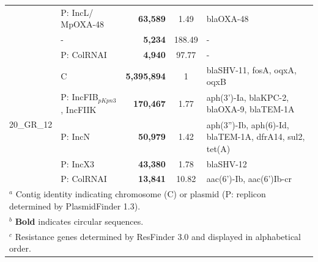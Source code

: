 \begin{landscape}
\begin{table}[!ht]
\begin{tabular}{|l|l|r|c|p{12cm}|}
                            & P: IncL/ MpOXA-48           & \textbf{63,589}       & 1.49     & blaOXA-48                                                                                                                                  \\ \cline{2-5} 
                            & -                           & \textbf{5,234}        & 188.49   & -                                                                                                                                          \\ \cline{2-5} 
                            & P: ColRNAI                  & \textbf{4,940 }       & 97.77    & -                                                                                                                                          \\ \hline \hline
\multirow{5}{*}{20\_GR\_12} & C                           & \textbf{5,395,894}     & 1        & blaSHV-11, fosA, oqxA, oqxB                                                                                                                \\ \cline{2-5} 
                            & P: IncFIB$_{pKpn3}$, IncFIIK     & \textbf{170,467}      & 1.77     & aph(3')-Ia, blaKPC-2, blaOXA-9, blaTEM-1A                                                                                                  \\ \cline{2-5} 
                            & P: IncN                     & \textbf{50,979}       & 1.42     & aph(3'')-Ib, aph(6)-Id, blaTEM-1A, dfrA14, sul2, tet(A)                                                                                    \\ \cline{2-5} 
                            & P: IncX3                    & \textbf{43,380}       & 1.78     & blaSHV-12                                                                                                                                  \\ \cline{2-5} 
                            & P: ColRNAI                  & \textbf{13,841}       & 10.82    & aac(6')-Ib, aac(6')Ib-cr                                                                                                                   \\ \hline
\multicolumn{5}{l}{{$^a$ Contig identity indicating chromosome (C) or plasmid (P: replicon determined by PlasmidFinder 1.3).}}\\
\multicolumn{5}{l}{{$^b$ \textbf{Bold} indicates circular sequences.}}\\
\multicolumn{5}{l}{{$^c$ Resistance genes determined by ResFinder 3.0 and displayed in alphabetical order.}}
\end{tabular}
\end{table}
\end{landscape}

